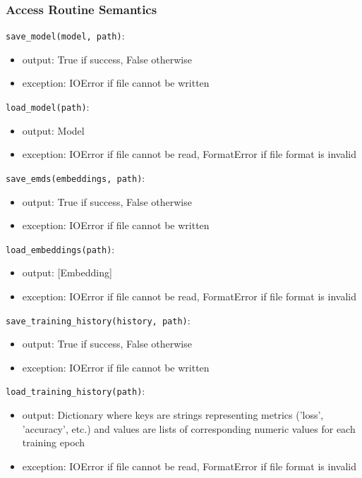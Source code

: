 \documentclass[12pt, titlepage]{article}
\begin{document}
\subsubsection{Access Routine Semantics}

\noindent \texttt{save\_model(model, path)}:
\begin{itemize}
\item output: True if success, False otherwise
\item exception: IOError if file cannot be written
\end{itemize}

\noindent \texttt{load\_model(path)}:
\begin{itemize}
\item output: Model
\item exception: IOError if file cannot be read, FormatError if file format is invalid
\end{itemize}

\noindent \texttt{save\_emds(embeddings, path)}:
\begin{itemize}
\item output: True if success, False otherwise
\item exception: IOError if file cannot be written
\end{itemize}

\noindent \texttt{load\_embeddings(path)}:
\begin{itemize}
\item output: [Embedding]
\item exception: IOError if file cannot be read, FormatError if file format is invalid
\end{itemize}

\noindent \texttt{save\_training\_history(history, path)}:
\begin{itemize}
\item output: True if success, False otherwise
\item exception: IOError if file cannot be written
\end{itemize}

\noindent \texttt{load\_training\_history(path)}:
\begin{itemize}
\item output: Dictionary where keys are strings representing metrics ('loss', 'accuracy', etc.) and values are lists of corresponding numeric values for each training epoch
\item exception: IOError if file cannot be read, FormatError if file format is invalid
\end{itemize}
\end{document}
